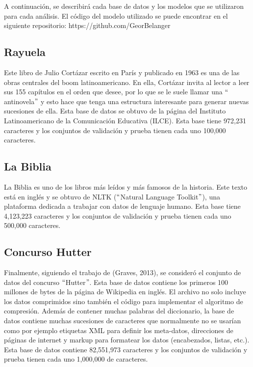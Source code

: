 A continuación, se describirá cada base de datos y los modelos que se utilizaron para cada análisis. El código del modelo utilizado se puede encontrar en el siguiente repositorio: https://github.com/GeorBelanger

\subsection{Rayuela}
Este libro de Julio Cortázar escrito en París y publicado en 1963 es una de las obras centrales del boom latinoamericano. En ella, Cortázar invita al lector a leer sus 155 capítulos en el orden que desee, por lo que se le suele llamar una $``$antinovela$"$ y esto hace que tenga una estructura interesante para generar nuevas sucesiones de ella.
Esta base de datos se obtuvo de la página del Instituto Latinoamericano de la Comunicación Educativa (ILCE). Esta base tiene 972,231 caracteres y los conjuntos de validación y prueba tienen cada uno 100,000 caracteres.
\cite{rayuela}
\cite{cortazar}


\subsection{La Biblia}
La Biblia es uno de los libros más leídos y más famosos de la historia. Este texto está en inglés y se obtuvo de NLTK ($``$Natural Language Toolkit$"$), una plataforma dedicada a trabajar con datos de lenguaje humano. Esta base tiene 4,123,223 caracteres y los conjuntos de validación y prueba tienen cada uno 500,000 caracteres.
\cite{nltk}

\subsection{Concurso Hutter}
Finalmente, siguiendo el trabajo de (Graves, 2013), se consideró el conjunto de datos del concurso $``$Hutter$"$. Esta base de datos contiene los primeros 100 millones de bytes de la página de Wikipedia en inglés. El archivo no solo incluye los datos comprimidos sino también el código para implementar el algoritmo de compresión. Además de contener muchas palabras del diccionario, la base de datos contiene muchas sucesiones de caracteres que normalmente no se usarían como por ejemplo etiquetas XML para definir los meta-datos, direcciones de páginas de internet y markup para formatear los datos (encabezados, listas, etc.). Esta base de datos contiene 82,551,973 caracteres y los conjuntos de validación y prueba tienen cada uno 1,000,000 de caracteres.
\cite{DBLP:journals/corr/Graves13}



